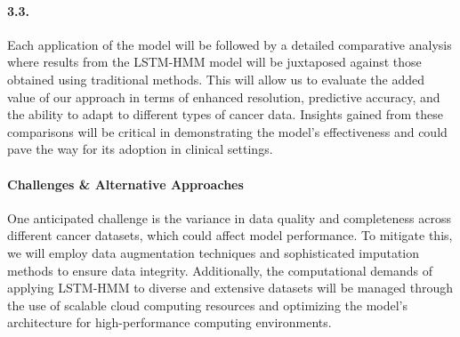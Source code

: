 \paragraph{3.3. \SpecificAimThreeC}

Each application of the model will be followed by a detailed comparative analysis where results from the LSTM-HMM model will be juxtaposed against those obtained using traditional methods. This will allow us to evaluate the added value of our approach in terms of enhanced resolution, predictive accuracy, and the ability to adapt to different types of cancer data. Insights gained from these comparisons will be critical in demonstrating the model’s effectiveness and could pave the way for its adoption in clinical settings.

\paragraph{Challenges \& Alternative Approaches}

One anticipated challenge is the variance in data quality and completeness across different cancer datasets, which could affect model performance. To mitigate this, we will employ data augmentation techniques and sophisticated imputation methods to ensure data integrity. Additionally, the computational demands of applying LSTM-HMM to diverse and extensive datasets will be managed through the use of scalable cloud computing resources and optimizing the model’s architecture for high-performance computing environments.